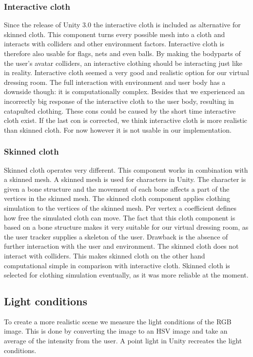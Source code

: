 \documentclass[twocolumn,a4paper]{article}
\begin{document}
\subsubsection{Interactive cloth}
\label{sec:interactive_cloth}	
Since the release of Unity 3.0 the interactive cloth is included as alternative for skinned cloth. This component turns every possible mesh into a cloth and interacts with colliders and other environment factors. Interactive cloth is therefore also usable for flags, nets and even balls. By making the bodyparts of the user's avatar colliders, an interactive clothing should be interacting just like in reality. Interactive cloth seemed a very good and realistic option for our virtual dressing room. The full interaction with environment and user body has a downside though: it is computationally complex. Besides that we experienced an incorrectly big response of the interactive cloth to the user body, resulting in catapulted clothing. These cons could be caused by the short time interactive cloth exist. If the last con is corrected, we think interactive cloth is more realistic than skinned cloth. For now however it is not usable in our implementation.
	 	
\subsubsection{Skinned cloth}
\label{sec:skinned_cloth}	 	
Skinned cloth operates very different. This component works in combination with a skinned mesh. A skinned mesh is used for characters in Unity. The character is given a bone structure and the movement of each bone affects a part of the vertices in the skinned mesh. The skinned cloth component applies clothing simulation to the vertices of the skinned mesh. Per vertex a coefficient defines how free the simulated cloth can move. The fact that this cloth component is based on a bone structure makes it very suitable for our virtual dressing room, as the user tracker supplies a skeleton of the user. Drawback is the absence of further interaction with the user and environment. The skinned cloth does not interact with colliders. This makes skinned cloth on the other hand computational simple in comparison with interactive cloth. Skinned cloth is selected for clothing simulation eventually, as it was more reliable at the moment.

\subsection{Light conditions}
\label{sec:light_conditions}
To create a more realistic scene we measure the light conditions of the RGB image. This is done by converting the image to an HSV image and take an average of the intensity from the user.
A point light in Unity recreates the light conditions.
\end{document}
